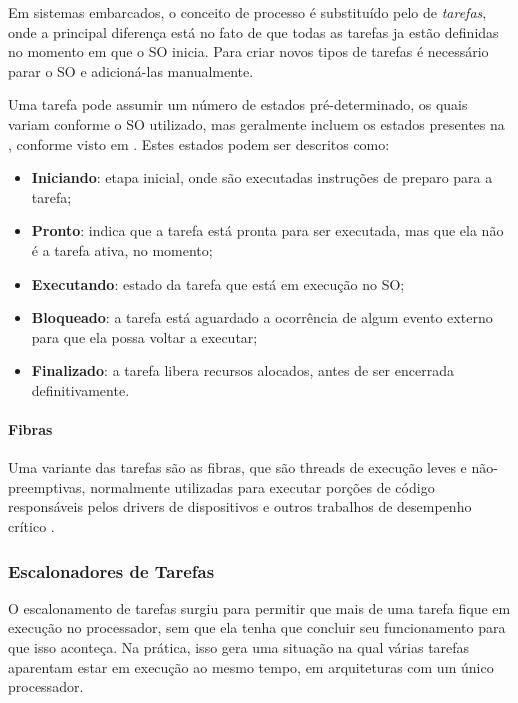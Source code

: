 Em sistemas embarcados, o conceito de processo é substituído pelo de \emph{tarefas}, onde a principal diferença está no fato de que todas as tarefas ja estão definidas no momento em que o SO inicia. Para criar novos tipos de tarefas é necessário parar o SO e adicioná-las manualmente.

Uma tarefa pode assumir um número de estados pré-determinado, os quais variam conforme o SO utilizado, mas geralmente incluem os estados presentes na , conforme visto em . Estes estados podem ser descritos como:

\begin{itemize}
	\item \textbf{Iniciando}: etapa inicial, onde são executadas instruções de preparo para a tarefa;
	\item \textbf{Pronto}: indica que a tarefa está pronta para ser executada, mas que ela não é a tarefa ativa, no momento;
	\item \textbf{Executando}: estado da tarefa que está em execução no SO;
	\item \textbf{Bloqueado}: a tarefa está aguardado a ocorrência de algum evento externo para que ela possa voltar a executar;
	\item \textbf{Finalizado}: a tarefa libera recursos alocados, antes de ser encerrada definitivamente.
\end{itemize}


\paragraph{Fibras}

Uma variante das tarefas são as fibras, que são threads de execução leves e não-preemptivas, normalmente utilizadas para executar porções de código responsáveis pelos drivers de dispositivos  e outros trabalhos de desempenho crítico \cite{rocket}.

\subsubsection{Escalonadores de Tarefas}

O escalonamento de tarefas surgiu para permitir que mais de uma tarefa fique em execução no processador, sem que ela tenha que concluir seu funcionamento para que isso aconteça. Na prática, isso gera uma situação na qual várias tarefas aparentam estar em execução ao mesmo tempo, em arquiteturas com um único processador.

